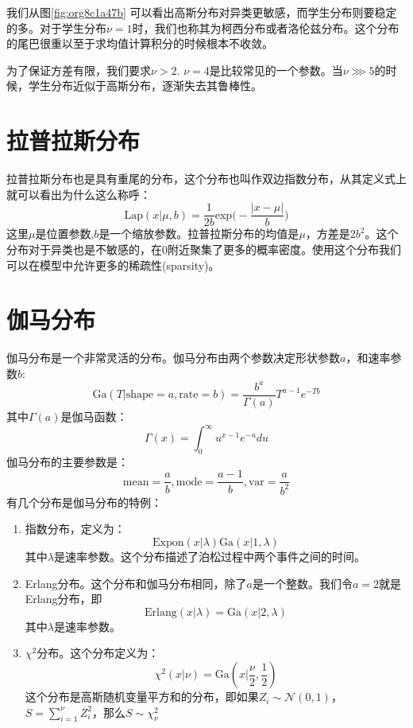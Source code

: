 \documentclass[10pt,a4paper,UTF8]{article}
\begin{document}
我们从图\ref{fig:org8c1a47b} 可以看出高斯分布对异类更敏感，而学生分布则要稳定的多。对于学生分布\(\nu=1\)时，我们也称其为柯西分布或者洛伦兹分布。这个分布的尾巴很重以至于求均值计算积分的时候根本不收敛。

为了保证方差有限，我们要求\(\nu > 2\). \(\nu = 4\)是比较常见的一个参数。当\(\nu \ggg 5\)的时候，学生分布近似于高斯分布，逐渐失去其鲁棒性。
\section{拉普拉斯分布}
\label{sec:orgc0c5392}


拉普拉斯分布也是具有重尾的分布，这个分布也叫作双边指数分布，从其定义式上就可以看出为什么这么称呼：
\begin{equation}
\label{eq:17}
\mathrm{Lap}(x| \mu ,b) = \frac{1}{2b} \mathrm{exp} \bigg( -\frac{|x-\mu|}{b} \bigg)
\end{equation}
这里\(\mu\)是位置参数,\(b\)是一个缩放参数。拉普拉斯分布的均值是\(\mu\)，方差是\(2b^{2}\)。这个分布对于异类也是不敏感的，在\(0\)附近聚集了更多的概率密度。使用这个分布我们可以在模型中允许更多的稀疏性(sparsity)。
\section{伽马分布}
\label{sec:orgccfcdb1}


伽马分布是一个非常灵活的分布。伽马分布由两个参数决定形状参数\(a\)，和速率参数\(b\):
\begin{equation}
\label{eq:18}
\mathrm{Ga}(T| \mathrm{shape} = a, \mathrm{rate} = b) = \frac{b^{a}}{\Gamma(a)}T^{a-1}e^{-Tb}
\end{equation}
其中\(\Gamma(a)\)是伽马函数：
\begin{equation}
\label{eq:19}
\Gamma(x) = \int_{0}^{\infty} u^{x-1} e^{-u} du
\end{equation}
伽马分布的主要参数是：
\begin{equation}
\label{eq:20}
\mathrm{mean} = \frac{a}{b}, \mathrm{mode} = \frac{a-1}{b}, \mathrm{var} = \frac{a}{b^{2}}
\end{equation}
有几个分布是伽马分布的特例：
\begin{enumerate}
\item 指数分布，定义为：\[ \mathrm{Expon}(x|\lambda) \mathrm{Ga}(x|1,\lambda) \]其中\(\lambda\)是速率参数。这个分布描述了泊松过程中两个事件之间的时间。
\item Erlang分布。这个分布和伽马分布相同，除了\(a\)是一个整数。我们令\(a=2\)就是Erlang分布，即\[ \mathrm{Erlang}(x|\lambda) = \mathrm{Ga}(x|2,\lambda) \]其中\(\lambda\)是速率参数。
\item \(\chi^{2}\)分布。这个分布定义为：\[ \chi^{2}(x|\nu) = \mathrm{Ga}(x| \frac{\nu}{2},\frac{1}{2} ) \]这个分布是高斯随机变量平方和的分布，即如果\(Z_{i}\sim \mathcal{N}(0,1)\)，\(S = \sum_{i=1}^{\nu}Z_{i}^{2}\)，那么\(S\sim \chi_{\nu}^{2}\)
\end{enumerate}
\end{document}
